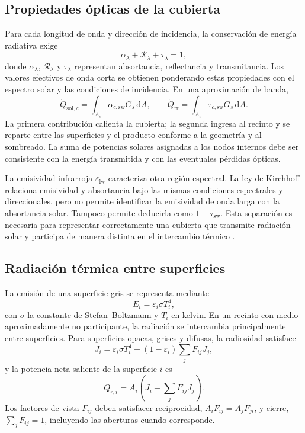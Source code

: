 \subsection{Propiedades ópticas de la cubierta}

Para cada longitud de onda y dirección de incidencia, la conservación de energía radiativa exige
\begin{equation}
\alpha_\lambda+\mathcal R_\lambda+\tau_\lambda=1,
\label{eq:radiativebalance}
\end{equation}
donde $\alpha_\lambda$, $\mathcal R_\lambda$ y $\tau_\lambda$ representan absortancia, reflectancia y transmitancia. Los valores efectivos de onda corta se obtienen ponderando estas propiedades con el espectro solar y las condiciones de incidencia. En una aproximación de banda,
\begin{equation}
\dot Q_{\mathrm{sol},c}=\int_{A_c}\alpha_{c,\mathrm{sw}}G_s\,\mathrm{d}A,
\qquad
\dot Q_{\mathrm{tr}}=\int_{A_c}\tau_{c,\mathrm{sw}}G_s\,\mathrm{d}A.
\label{eq:potencia_solar_cubierta}
\end{equation}
La primera contribución calienta la cubierta; la segunda ingresa al recinto y se reparte entre las superficies y el producto conforme a la geometría y al sombreado. La suma de potencias solares asignadas a los nodos internos debe ser consistente con la energía transmitida y con las eventuales pérdidas ópticas.

La emisividad infrarroja $\varepsilon_{\mathrm{lw}}$ caracteriza otra región espectral. La ley de Kirchhoff relaciona emisividad y absortancia bajo las mismas condiciones espectrales y direccionales, pero no permite identificar la emisividad de onda larga con la absortancia solar. Tampoco permite deducirla como $1-\tau_{\mathrm{sw}}$. Esta separación es necesaria para representar correctamente una cubierta que transmite radiación solar y participa de manera distinta en el intercambio térmico \cite{duffie2013,bergman2017}.

\subsection{Radiación térmica entre superficies}

La emisión de una superficie gris se representa mediante
\begin{equation}
E_i=\varepsilon_i\sigma T_i^4,
\label{eq:stefan}
\end{equation}
con $\sigma$ la constante de Stefan--Boltzmann y $T_i$ en kelvin. En un recinto con medio aproximadamente no participante, la radiación se intercambia principalmente entre superficies. Para superficies opacas, grises y difusas, la radiosidad satisface
\begin{equation}
J_i=\varepsilon_i\sigma T_i^4
+(1-\varepsilon_i)\sum_jF_{ij}J_j,
\label{eq:radiosidad}
\end{equation}
y la potencia neta saliente de la superficie $i$ es
\begin{equation}
\dot Q_{r,i}=A_i\left(J_i-\sum_jF_{ij}J_j\right).
\label{eq:potencia_radiosidad}
\end{equation}
Los factores de vista $F_{ij}$ deben satisfacer reciprocidad, $A_iF_{ij}=A_jF_{ji}$, y cierre, $\sum_jF_{ij}=1$, incluyendo las aberturas cuando corresponde.

